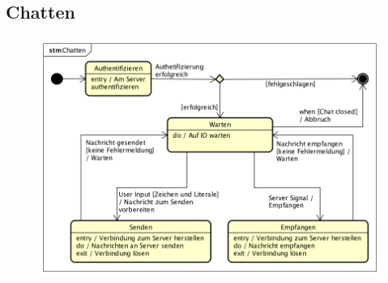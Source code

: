 \subsection*{Chatten}
\begin{figure}[h!]
	\centering
	\includegraphics[width = 0.8\linewidth]{docs/4_Zustandsdiagramme/Patrick/STM_Chatten.png}
	\label{fig:STM_Chatten}
\end{figure}